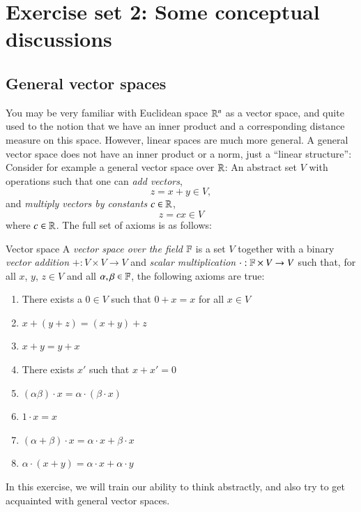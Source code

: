 \documentclass[12pt]{report}
\begin{document}
\chapter{Exercise set 2: Some conceptual discussions}

\section{General vector spaces}


You may be very familiar with Euclidean space $\mathbb{R}^n$ as a vector space, and quite used to the notion that we have an inner product and a corresponding distance measure on this space. However, linear spaces are much more general. A general vector space does not have an inner product or a norm, just a ``linear structure'': Consider for example a general vector space over $\mathbb{R}$: An abstract set $V$ with operations such that one can \emph{add vectors},
$$ z = x + y \in V, $$
and \emph{multiply vectors by constants} $c\in\mathbb{R}$,
$$ z = c x \in V $$
where $c \in \mathbb{R}$. The full set of axioms is as follows:

\begin{myDefinitionx}{Vector space}{}
    A \emph{vector space over the field $\mathbb{F}$} is a set $V$ together with a binary \emph{vector addition} $+ : V \times V \to V$ and \emph{scalar multiplication} $\cdot : \mathbb{F} \times V \to V$ such that, for all $x$, $y$, $z \in V$ and all $\alpha,\beta \in \mathbb{F}$, the following axioms are true:
    \begin{enumerate}
        \item There exists a $0\in V$ such that $0 + x = x$ for all $x\in V$ 
        \item  $ x + (y + z) = (x + y) + z$ 
        \item $x + y = y + x$ 
        \item There exists $x'$ such that $x+x'=0$ 
        \item $(\alpha\beta)\cdot x = \alpha\cdot(\beta\cdot x)$ 
        \item $1\cdot x = x$ 
        \item $(\alpha + \beta)\cdot x = \alpha\cdot x + \beta\cdot x$ 
        \item $\alpha \cdot (x + y) = \alpha\cdot x + \alpha \cdot y$ 
    \end{enumerate}
\end{myDefinitionx}
In this exercise, we will train our ability to think abstractly, and also try to get acquainted with general vector spaces.
\end{document}
